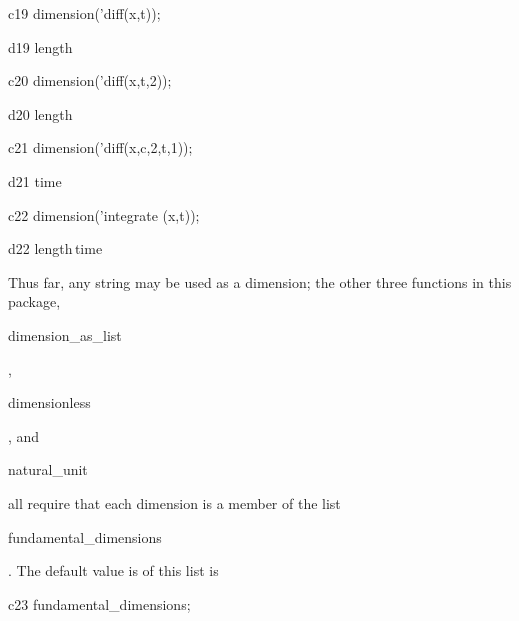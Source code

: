 \documentclass[12pt]{article}
\begin{document}
\begin{mcline}{c19}
dimension('diff(x,t));
\end{mcline}



\begin{mdline}{d19}
{{length}}
\end{mdline}

\begin{mcline}{c20}
dimension('diff(x,t,2));
\end{mcline}



\begin{mdline}{d20}
{{length}}
\end{mdline}

\begin{mcline}{c21}
dimension('diff(x,c,2,t,1));
\end{mcline}



\begin{mdline}{d21}
{{time}}
\end{mdline}

\begin{mcline}{c22}
dimension('integrate (x,t));
\end{mcline}

\begin{mdline}{d22}
length\,time
\end{mdline}

\vspace{0.1in}

Thus far, any string may be used as a dimension; the other
three functions in this package, 
\begin{verb} dimension_as_list  \end{verb}, 
\begin{verb} dimensionless \end{verb}, and
\begin{verb} natural_unit \end{verb} all require that each
dimension is a member of  the list 
\begin{verb} fundamental_dimensions \end{verb}. The default value  is of 
this list is

\vspace{0.1in}

\begin{mcline}{c23}
fundamental_dimensions;
\end{mcline}
\end{document}
